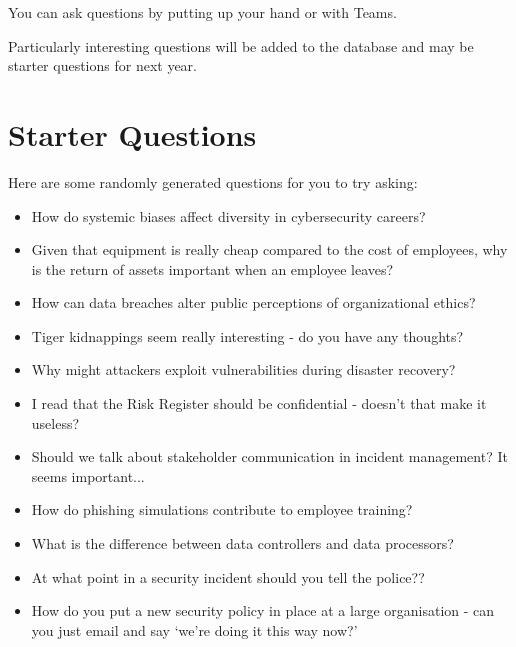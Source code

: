 \documentclass[12pt]{article}
\begin{document}
You can ask questions by putting up your hand or with Teams.  

Particularly interesting questions will be added to the database and may be starter questions for next year.  

\section*{Starter Questions} 
Here are some randomly generated questions for you to try asking: 

\begin{itemize}
  \item How do systemic biases affect diversity in cybersecurity careers?
  \item Given that equipment is really cheap compared to the cost of employees, why is the return of assets important when an employee leaves?
  \item How can data breaches alter public perceptions of organizational ethics?
  \item Tiger kidnappings seem really interesting - do you have any thoughts?
  \item Why might attackers exploit vulnerabilities during disaster recovery?
  \item I read that the Risk Register should be confidential - doesn't that make it useless?
  \item Should we talk about stakeholder communication in incident management? It seems important...
  \item How do phishing simulations contribute to employee training?
  \item What is the difference between data controllers and data processors?
  \item At what point in a security incident should you tell the police??
  \item How do you put a new security policy in place at a large organisation - can you just email and say `we're doing it this way now?'
\end{itemize}


%
%



\maketitle
\end{document}
